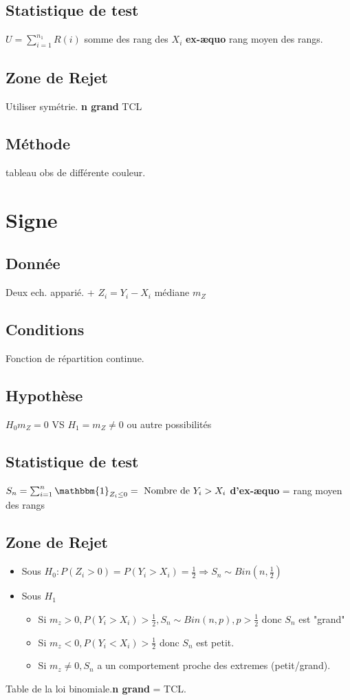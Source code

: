 \documentclass[9pt]{article}
\theoremstyle{plain}%
\theoremstyle{definition}
\theoremstyle{remark}
\begin{document}
\begin{multicols}{3}
\subsection*{Statistique de test}
$U = \sum_{i=1}^{n_1}R(i) $ somme des rang des $ X_i $ 
\textbf{ex-æquo} rang moyen des rangs.

\subsection*{Zone de Rejet}
Utiliser symétrie.
\textbf{n grand} TCL

\subsection*{Méthode}
tableau obs de différente couleur.

\section{Signe}
\subsection*{Donnée}
Deux ech. apparié. + $ Z_i = Y_i - X_i $ médiane $ m_Z $ 

\subsection*{Conditions}
Fonction de répartition continue.

\subsection*{Hypothèse}
$ H_0 m_Z = 0 $ VS $ H_1 = m_Z \neq 0 $ ou autre possibilités

\subsection*{Statistique de test}
$S_n = \sum_{i=1}^{n}\mathbbm{1}_{Z_i \leq 0} = \text{ Nombre de } Y_i > X_i$ \textbf{d'ex-æquo} = rang moyen des rangs


\subsection*{Zone de Rejet}
\begin{itemize}
    \item Sous $ H_0 : P(Z_i > 0) = P(Y_i > X_i) = \frac{1}{2} \Rightarrow S_n \sim Bin(n,\frac{1}{2})$
    \item Sous $ H_1 $ \begin{itemize}
        \item Si $ m_z > 0, P(Y_i > X_i) > \frac{1}{2}, S_n \sim Bin(n,p), p> \frac{1}{2} $ donc $ S_n $ est "grand"
        \item Si $ m_z < 0, P(Y_i < X_i) > \frac{1}{2} $ donc $ S_n $ est petit.
        \item Si $ m_z \neq  0, S_n $ a un comportement proche des extremes (petit/grand).
    \end{itemize}
\end{itemize}
Table de la loi binomiale.\textbf{n grand} = TCL.



\end{multicols}
\end{document}
